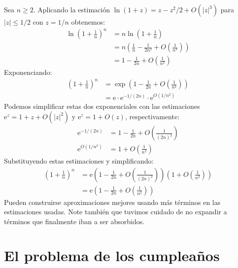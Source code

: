   Sea \(n \ge 2\).
  Aplicando la estimación \(\ln (1 + z) = z - z^2/2 + O(\lvert z \rvert^3)\)
  para \(\lvert z \rvert \le 1/2\) con \(z = 1/n\) obtenemos:
  \begin{align*}
    \ln \left( 1 + \frac{1}{n} \right)^n
      &= n \ln \left( 1 + \frac{1}{n} \right) \\
      &= n \left(
             \frac{1}{n} - \frac{1}{2 n^2} + O\left( \frac{1}{n^3} \right)
           \right) \\
      &= 1 - \frac{1}{2 n} + O\left( \frac{1}{n^2} \right)
  \end{align*}
  Exponenciando:
  \begin{align*}
    \left( 1 + \frac{1}{n} \right)^n
      &= \exp\left(
               1 - \frac{1}{2 n} + O\left( \frac{1}{n^2} \right)
             \right) \\
      &= \mathrm{e}
           \cdot \mathrm{e}^{-1 / (2 n)}
           \cdot \mathrm{e}^{O(1 / n^2)}
  \end{align*}
  Podemos simplificar estas dos exponenciales
  con las estimaciones \(\mathrm{e}^z = 1 + z + O(\lvert z \rvert^2)\)
  y \(\mathrm{e}^z = 1 + O(z)\),
  respectivamente:
  \begin{align*}
    \mathrm{e}^{-1 / (2 n)}
      &= 1 - \frac{1}{2 n} + O\left( \frac{1}{(2 n)^2} \right) \\
    \mathrm{e}^{O(1 / n^2)}
      &= 1 + O\left( \frac{1}{n^2} \right)
  \end{align*}
  Substituyendo estas estimaciones y simplificando:
  \begin{align*}
    \left( 1 + \frac{1}{n} \right)^n
      &= \mathrm{e}
           \left(
             1 - \frac{1}{2 n} + O\left( \frac{1}{(2 n)^2} \right)
           \right)
           \left(
             1 + O\left( \frac{1}{n^2} \right)
           \right) \\
      &= \mathrm{e}
           \left(
             1 - \frac{1}{2 n} + O\left( \frac{1}{n^2} \right)
           \right)
  \end{align*}
  Pueden construirse aproximaciones mejores usando más términos
  en las estimaciones usadas.
  Note también que tuvimos cuidado de no expandir a términos
  que finalmente iban a ser absorbidos.

\section{El problema de los cumpleaños}
\label{sec:birthday-problem}

